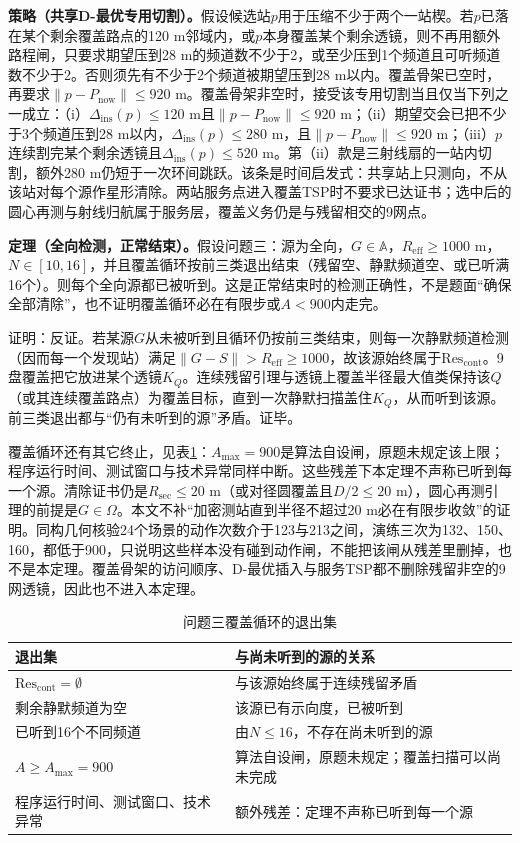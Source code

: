 \documentclass{cumcmthesis}
\begin{document}
\textbf{策略（共享D-最优专用切割）。}假设候选站$p$用于压缩不少于两个一站楔。若$p$已落在某个剩余覆盖路点的120 m邻域内，或$p$本身覆盖某个剩余透镜，则不再用额外路程闸，只要求期望压到28 m的频道数不少于2，或至少压到1个频道且可听频道数不少于2。否则须先有不少于2个频道被期望压到28 m以内。覆盖骨架已空时，再要求$\|p-P_{\mathrm{now}}\|\le 920$ m。覆盖骨架非空时，接受该专用切割当且仅当下列之一成立：（i）$\Delta_{\mathrm{ins}}(p)\le 120$ m且$\|p-P_{\mathrm{now}}\|\le 920$ m；（ii）期望交会已把不少于3个频道压到28 m以内，$\Delta_{\mathrm{ins}}(p)\le 280$ m，且$\|p-P_{\mathrm{now}}\|\le 920$ m；（iii）$p$连续割完某个剩余透镜且$\Delta_{\mathrm{ins}}(p)\le 520$ m。第（ii）款是三射线扇的一站内切割，额外280 m仍短于一次环间跳跃。该条是时间启发式：共享站上只测向，不从该站对每个源作星形清除。两站服务点进入覆盖TSP时不要求已达证书；选中后的圆心再测与射线归航属于服务层，覆盖义务仍是与残留相交的9网点。

\textbf{定理（全向检测，正常结束）。}假设问题三：源为全向，$G\in\mathbb{A}$，$R_{\mathrm{eff}}\ge 1000$ m，$N\in[10,16]$，并且覆盖循环按前三类退出结束（残留空、静默频道空、或已听满16个）。则每个全向源都已被听到。这是正常结束时的检测正确性，不是题面“确保全部清除”，也不证明覆盖循环必在有限步或$A<900$内走完。

证明：反证。若某源$G$从未被听到且循环仍按前三类结束，则每一次静默频道检测（因而每一个发现站）满足$\|G-S\|>R_{\mathrm{eff}}\ge 1000$，故该源始终属于$\mathrm{Res}_{\mathrm{cont}}$。9盘覆盖把它放进某个透镜$K_Q$。连续残留引理与透镜上覆盖半径最大值类保持该$Q$（或其连续覆盖路点）为覆盖目标，直到一次静默扫描盖住$K_Q$，从而听到该源。前三类退出都与“仍有未听到的源”矛盾。证毕。

覆盖循环还有其它终止，见表\ref{tab:q3exit}：$A_{\max}=900$是算法自设闸，原题未规定该上限；程序运行时间、测试窗口与技术异常同样中断。这些残差下本定理不声称已听到每一个源。清除证书仍是$R_{\mathrm{sec}}\le 20$ m（或对径圆覆盖且$D/2\le 20$ m），圆心再测引理的前提是$G\in\Omega$。本文不补“加密测站直到半径不超过20 m必在有限步收敛”的证明。同构几何核验24个场景的动作次数介于123与213之间，演练三次为132、150、160，都低于900，只说明这些样本没有碰到动作闸，不能把该闸从残差里删掉，也不是本定理。覆盖骨架的访问顺序、D-最优插入与服务TSP都不删除残留非空的9网透镜，因此也不进入本定理。

\begin{table}[htbp]
\centering
\caption{问题三覆盖循环的退出集}
\label{tab:q3exit}
\begin{tabular}{>{\raggedright\arraybackslash}p{}>{\raggedright\arraybackslash}p{}}
\toprule
退出集 & 与尚未听到的源的关系 \\
\midrule
$\mathrm{Res}_{\mathrm{cont}}=\emptyset$ & 与该源始终属于连续残留矛盾 \\
剩余静默频道为空 & 该源已有示向度，已被听到 \\
已听到16个不同频道 & 由$N\le 16$，不存在尚未听到的源 \\
$A\ge A_{\max}=900$ & 算法自设闸，原题未规定；覆盖扫描可以尚未完成 \\
程序运行时间、测试窗口、技术异常 & 额外残差：定理不声称已听到每一个源 \\
\bottomrule
\end{tabular}
\end{table}
\end{document}
